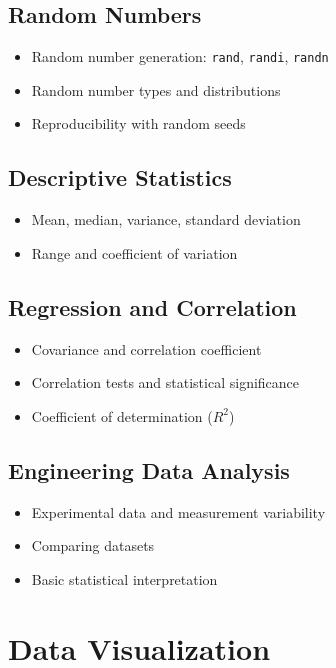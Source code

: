 \documentclass[11pt, a4paper]{article}
\begin{document}
\subsection{Random Numbers}
\begin{itemize}
  \item Random number generation: \texttt{rand}, \texttt{randi}, \texttt{randn}
  \item Random number types and distributions
  \item Reproducibility with random seeds
\end{itemize}

\subsection{Descriptive Statistics}
\begin{itemize}
  \item Mean, median, variance, standard deviation
  \item Range and coefficient of variation
\end{itemize}

\subsection{Regression and Correlation}
\begin{itemize}
  \item Covariance and correlation coefficient
  \item Correlation tests and statistical significance
  \item Coefficient of determination ($R^2$)
\end{itemize}

\subsection{Engineering Data Analysis}
\begin{itemize}
  \item Experimental data and measurement variability
  \item Comparing datasets
  \item Basic statistical interpretation
\end{itemize}

\section{Data Visualization}
\end{document}
